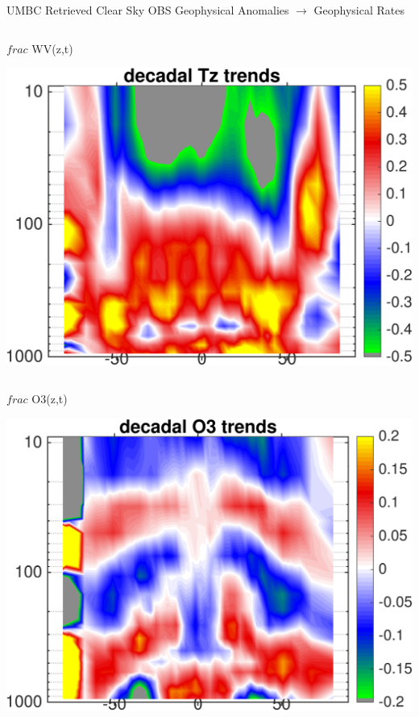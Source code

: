 \documentclass[10pt,t]{beamer}
\begin{document}
\begin{frame}{UMBC Retrieved Clear Sky OBS Geophysical Anomalies $\rightarrow$ Geophysical Rates}
\begin{columns}
\begin{column}{0.45\columnwidth}
\begin{block}{\footnotesize $frac$ WV(z,t)}
\vspace{-0.1in}
\begin{center}
\includegraphics[width=\linewidth]{Figs/ClearAnom/umbc_clr_retr_obs_wv_rate_200209_201808.png}
\end{center}
\end{block}
\end{column}
\end{columns}

\vspace{-0.25in}

\begin{columns}
\begin{column}{0.45\columnwidth}
\begin{block}{\footnotesize $frac$ O3(z,t)}
\vspace{-0.1in}
\begin{center}
\includegraphics[width=\linewidth]{Figs/ClearAnom/umbc_clr_retr_obs_o3_rate_200209_201808.png}
\end{center}
\end{block}
\end{column}


\end{columns}
\end{frame}
\end{document}
